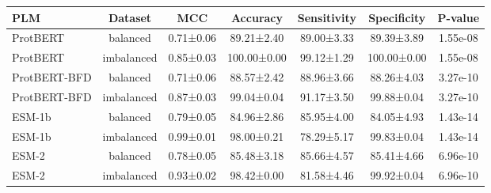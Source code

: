 \begin{tabular}{lcccccc}
\toprule
         PLM &    Dataset &       MCC &    Accuracy & Sensitivity & Specificity &  P-value \\
\midrule
    ProtBERT &   balanced & 0.71±0.06 &  89.21±2.40 &  89.00±3.33 &  89.39±3.89 & 1.55e-08 \\
    ProtBERT & imbalanced & 0.85±0.03 & 100.00±0.00 &  99.12±1.29 & 100.00±0.00 & 1.55e-08 \\
ProtBERT-BFD &   balanced & 0.71±0.06 &  88.57±2.42 &  88.96±3.66 &  88.26±4.03 & 3.27e-10 \\
ProtBERT-BFD & imbalanced & 0.87±0.03 &  99.04±0.04 &  91.17±3.50 &  99.88±0.04 & 3.27e-10 \\
      ESM-1b &   balanced & 0.79±0.05 &  84.96±2.86 &  85.95±4.00 &  84.05±4.93 & 1.43e-14 \\
      ESM-1b & imbalanced & 0.99±0.01 &  98.00±0.21 &  78.29±5.17 &  99.83±0.04 & 1.43e-14 \\
       ESM-2 &   balanced & 0.78±0.05 &  85.48±3.18 &  85.66±4.57 &  85.41±4.66 & 6.96e-10 \\
       ESM-2 & imbalanced & 0.93±0.02 &  98.42±0.00 &  81.58±4.46 &  99.92±0.04 & 6.96e-10 \\
\bottomrule
\end{tabular}
